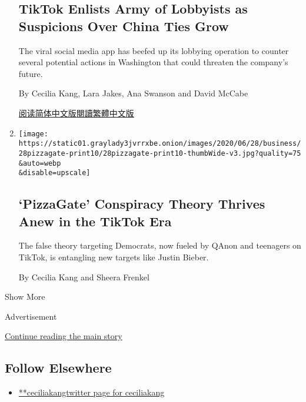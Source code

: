 \begin{enumerate}
  \hypertarget{tiktok-enlists-army-of-lobbyists-as-suspicions-over-china-ties-grow}{%
  \subsection{TikTok Enlists Army of Lobbyists as Suspicions Over China
  Ties
  Grow}\label{tiktok-enlists-army-of-lobbyists-as-suspicions-over-china-ties-grow}}

  The viral social media app has beefed up its lobbying operation to
  counter several potential actions in Washington that could threaten
  the company's future.

  By Cecilia Kang, Lara Jakes, Ana Swanson and David McCabe

  \href{https://cn.nytimes3xbfgragh.onion/technology/20200716/tiktok-washington-lobbyist/}{阅读简体中文版}\href{https://cn.nytimes3xbfgragh.onion/technology/20200716/tiktok-washington-lobbyist/zh-hant/}{閱讀繁體中文版}
\item
  \href{/2020/06/27/technology/pizzagate-justin-bieber-qanon-tiktok.html}{}

  \texttt{[image: https://static01.graylady3jvrrxbe.onion/images/2020/06/28/business/28pizzagate-print10/28pizzagate-print10-thumbWide-v3.jpg?quality=75\\\&auto=webp\\\&disable=upscale]}

  \hypertarget{pizzagate-conspiracy-theory-thrives-anew-in-the-tiktok-era}{%
  \subsection{`PizzaGate' Conspiracy Theory Thrives Anew in the TikTok
  Era}\label{pizzagate-conspiracy-theory-thrives-anew-in-the-tiktok-era}}

  The false theory targeting Democrats, now fueled by QAnon and
  teenagers on TikTok, is entangling new targets like Justin Bieber.

  By Cecilia Kang and Sheera Frenkel
\end{enumerate}

Show More

Advertisement

\protect\hyperlink{after-mid2}{Continue reading the main story}

\hypertarget{follow-elsewhere}{%
\subsection{Follow Elsewhere}\label{follow-elsewhere}}

\begin{itemize}
\tightlist
\item
  \href{https://twitter.com/ceciliakang}{**ceciliakangtwitter page for
  ceciliakang}
\end{itemize}

